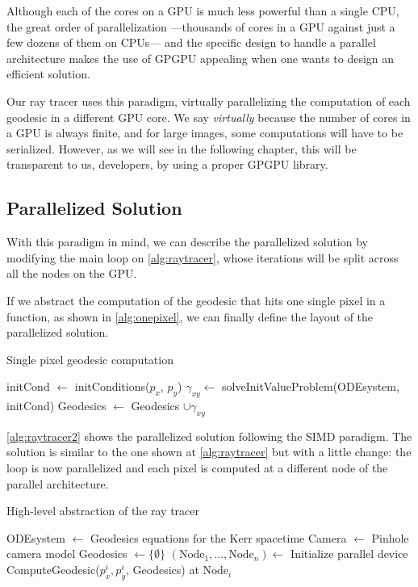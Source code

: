 Although each of the cores on a \ac{GPU} is much less powerful than a single \ac{CPU}, the great order of parallelization ---thousands of cores in a \ac{GPU} against just a few dozens of them on \acp{CPU}--- and the specific design to handle a parallel architecture makes the use of \ac{GPGPU} appealing when one wants to design an efficient solution.

Our ray tracer uses this paradigm, virtually parallelizing the computation of each geodesic in a different \ac{GPU} core. We say \emph{virtually} because the number of cores in a \ac{GPU} is always finite, and for large images, some computations will have to be serialized. However, as we will see in the following chapter, this will be transparent to us, developers, by using a proper \ac{GPGPU} library.

\subsection{Parallelized Solution}

With this paradigm in mind, we can describe the parallelized solution by modifying the main loop on \autoref{alg:raytracer}, whose iterations will be split across all the nodes on the \ac{GPU}.

If we abstract the computation of the geodesic that hits one single pixel in a function, as shown in \autoref{alg:onepixel}, we can finally define the layout of the parallelized solution.

\begin{algorithm}[bth]
	\caption{Single pixel geodesic computation}
	\label{alg:onepixel}
	\begin{algorithmic}[1]
		\State initCond $\gets$ initConditions($p_x$, $p_y$)
		\State $\gamma_{xy} \gets$ solveInitValueProblem(ODEsystem, initCond)
		\State Geodesics $\gets$ Geodesics $\cup \gamma_{xy}$
		\EndFunction
	\end{algorithmic}
\end{algorithm}

\autoref{alg:raytracer2} shows the parallelized solution following the \ac{SIMD} paradigm. The solution is similar to the one shown at \autoref{alg:raytracer} but with a little change: the loop is now parallelized and each pixel is computed at a different node of the parallel architecture.

\begin{algorithm}
	\caption{High-level abstraction of the ray tracer}
	\label{alg:raytracer2}
	\begin{algorithmic}[1]
		\State ODEsystem $\gets$ Geodesics equations for the Kerr spacetime
		\State Camera $\gets$ Pinhole camera model
		\State Geodesics $\gets \{\emptyset\}$
		\State $(\textrm{Node}_1, \dots, \textrm{Node}_n) \gets$ Initialize parallel device
		\State ComputeGeodesic($p^i_x, p^i_y$, Geodesics) at $\textrm{Node}_i$
		\EndFor
		\EndFunction
	\end{algorithmic}
\end{algorithm}

